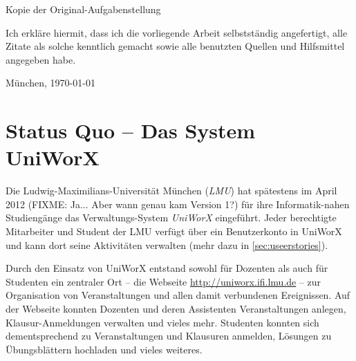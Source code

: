 \documentclass[11pt,a4paper,twoside,ngerman]{article}
\begin{document}
Kopie der Original-Aufgabenstellung

\vfill %

\noindent Ich erkl\"are hiermit, dass ich die vorliegende Arbeit
selbstst\"andig angefertigt, alle Zitate als solche kenntlich gemacht
sowie alle benutzten Quellen und Hilfsmittel angegeben habe.

\bigskip\noindent M\"unchen, \today

\vspace{4ex}\noindent\makebox[7cm]{\dotfill}


\cleardoublepage
\pagestyle{fancy}
\setcounter{page}{1}

\tableofcontents


\cleardoublepage

\setcounter{page}{1}
\fancyhead[LE,RO]{\rightmark}
\fancyhead[LO,RE]{\leftmark}
\fancyfoot[LE,RO]{\thepage}

\section{Status Quo -- Das System UniWorX} \label{sec:uniworx}
Die Ludwig-Maximilians-Universität München (\emph{LMU}) hat spätestens im April 2012 (FIXME: Ja... Aber wann genau kam Version 1?) für ihre Informatik-nahen Studiengänge das Verwaltungs-System \emph{UniWorX} eingeführt. Jeder berechtigte Mitarbeiter und Student der LMU verfügt über ein Benutzerkonto in UniWorX und kann dort seine Aktivitäten verwalten (mehr dazu in \autoref{sec:useerstories}).

Durch den Einsatz von UniWorX entstand sowohl für Dozenten als auch für Studenten ein zentraler Ort -- die Webseite \url{http://uniworx.ifi.lmu.de} -- zur Organisation von Veranstaltungen und allen damit verbundenen Ereignissen. Auf der Webseite konnten Dozenten und deren Assistenten Veranstaltungen anlegen, Klausur-Anmeldungen verwalten und vieles mehr. Studenten konnten sich dementsprechend zu Veranstaltungen und Klausuren anmelden, Lösungen zu Übungsblättern hochladen und vieles weiteres.
\end{document}
